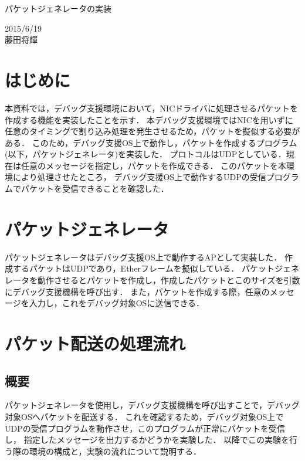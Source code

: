 \documentclass[12pt]{jsarticle}
\begin{document}

\begin{center}
    {\LARGE パケットジェネレータの実装}
\end{center}

\begin{flushright}
  2015/6/19\\
  藤田将輝
\end{flushright}
\section{はじめに}
本資料では，デバッグ支援環境において，NICドライバに処理させるパケットを作成する機能を実装したことを示す．
本デバッグ支援環境ではNICを用いずに任意のタイミングで割り込み処理を発生させるため，パケットを擬似する必要がある．
このため，デバッグ支援OS上で動作し，パケットを作成するプログラム(以下，パケットジェネレータ)を実装した．
プロトコルはUDPとしている．現在は任意のメッセージを指定し，パケットを作成できる．
このパケットを本環境により処理させたところ，
デバッグ支援OS上で動作するUDPの受信プログラムでパケットを受信できることを確認した．
\section{パケットジェネレータ}
パケットジェネレータはデバッグ支援OS上で動作するAPとして実装した．
作成するパケットはUDPであり，Etherフレームを擬似している．
パケットジェネレータを動作させるとパケットを作成し，作成したパケットとこのサイズを引数にデバッグ支援機構を呼び出す．
また，パケットを作成する際，任意のメッセージを入力し，これをデバッグ対象OSに送信できる．
\section{パケット配送の処理流れ}
\subsection{概要}
パケットジェネレータを使用し，デバッグ支援機構を呼び出すことで，デバッグ対象OSへパケットを配送する．
これを確認するため，デバッグ対象OS上でUDPの受信プログラムを動作させ，このプログラムが正常にパケットを受信し，
指定したメッセージを出力するかどうかを実験した．
以降でこの実験を行う際の環境の構成と，実験の流れについて説明する．
\end{document}
